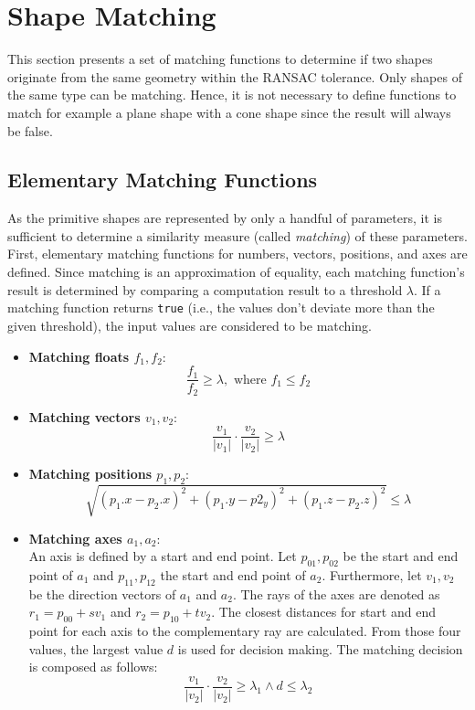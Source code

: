 \section{Shape Matching}
\label{sec:shapeMatching}

This section presents a set of matching functions to determine if two shapes originate from the same geometry within the RANSAC tolerance. Only shapes of the same type can be matching. Hence, it is not necessary to define functions to match for example a plane shape with a cone shape since the result will always be false. 


\subsection{Elementary Matching Functions}
\label{sec:elementarMatchingFuns}

As the primitive shapes are represented by only a handful of parameters, it is sufficient to determine a similarity measure (called \textit{matching}) of these parameters. First, elementary matching functions for numbers, vectors, positions, and axes are defined. Since matching is an approximation of equality, each matching function's result is determined by comparing a computation result to a threshold $\lambda$. If a matching function returns \verb|true| (i.e., the values don't deviate more than the given threshold), the input values are considered to be matching. 

\begin{itemize}
    \item \textbf{Matching floats $f_1, f_2$}: 
        $$\frac{f_1}{f_2} \geq \lambda, \textrm{ where } f_1 \leq f_2$$  
    \item \textbf{Matching vectors $v_1, v_2$}: 
        $$\frac{v_1}{|v_1|} \cdot \frac{v_2}{|v_2|} \geq \lambda$$
    \item \textbf{Matching positions $p_1, p_2$}: 
        $$\sqrt{(p_1.x - p_2.x)^2 + (p_1.y - p2_y)^2 + (p_1.z - p_2.z)^2} \leq \lambda$$
    \item \textbf{Matching axes $a_1, a_2$}: 
    \\
    An axis is defined by a start and end point. Let $p_{01},p_{02}$ be the start and end point of $a_1$ and $p_{11}, p_{12}$ the start and end point of $a_2$. Furthermore, let $v_1, v_2$ be the direction vectors of $a_1$ and $a_2$. The rays of the axes are denoted as $r_1 = p_{00} + sv_1$ and $r_2 = p_{10} + tv_2$. The closest distances for start and end point for each axis to the complementary ray are calculated. From those four values, the largest value $d$ is used for decision making. The matching decision is composed as follows: 
        $$\frac{v_1}{|v_2|} \cdot \frac{v_2}{|v_2|} \geq \lambda_1 \land d \leq \lambda_2$$
\end{itemize}


